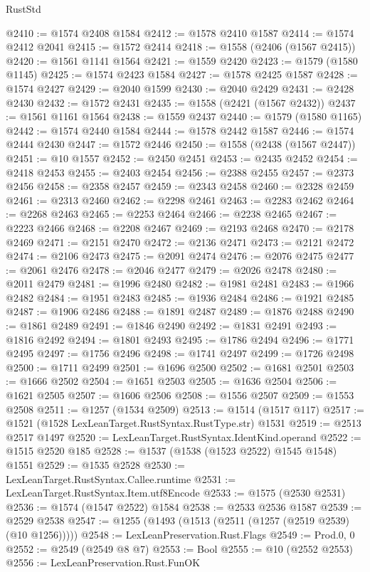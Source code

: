 \begin{lexlean}{RustStd}
\begin{coremodule}
@2410 := @1574 @2408 @1584
@2412 := @1578 @2410 @1587
@2414 := @1574 @2412 @2041
@2415 := @1572 @2414
@2418 := @1558 (@2406 (@1567 @2415))
@2420 := @1561 @1141 @1564
@2421 := @1559 @2420
@2423 := @1579 (@1580 @1145)
@2425 := @1574 @2423 @1584
@2427 := @1578 @2425 @1587
@2428 := @1574 @2427
@2429 := @2040 @1599
@2430 := @2040 @2429
@2431 := @2428 @2430
@2432 := @1572 @2431
@2435 := @1558 (@2421 (@1567 @2432))
@2437 := @1561 @1161 @1564
@2438 := @1559 @2437
@2440 := @1579 (@1580 @1165)
@2442 := @1574 @2440 @1584
@2444 := @1578 @2442 @1587
@2446 := @1574 @2444 @2430
@2447 := @1572 @2446
@2450 := @1558 (@2438 (@1567 @2447))
@2451 := @10 @1557
@2452 := @2450 @2451
@2453 := @2435 @2452
@2454 := @2418 @2453
@2455 := @2403 @2454
@2456 := @2388 @2455
@2457 := @2373 @2456
@2458 := @2358 @2457
@2459 := @2343 @2458
@2460 := @2328 @2459
@2461 := @2313 @2460
@2462 := @2298 @2461
@2463 := @2283 @2462
@2464 := @2268 @2463
@2465 := @2253 @2464
@2466 := @2238 @2465
@2467 := @2223 @2466
@2468 := @2208 @2467
@2469 := @2193 @2468
@2470 := @2178 @2469
@2471 := @2151 @2470
@2472 := @2136 @2471
@2473 := @2121 @2472
@2474 := @2106 @2473
@2475 := @2091 @2474
@2476 := @2076 @2475
@2477 := @2061 @2476
@2478 := @2046 @2477
@2479 := @2026 @2478
@2480 := @2011 @2479
@2481 := @1996 @2480
@2482 := @1981 @2481
@2483 := @1966 @2482
@2484 := @1951 @2483
@2485 := @1936 @2484
@2486 := @1921 @2485
@2487 := @1906 @2486
@2488 := @1891 @2487
@2489 := @1876 @2488
@2490 := @1861 @2489
@2491 := @1846 @2490
@2492 := @1831 @2491
@2493 := @1816 @2492
@2494 := @1801 @2493
@2495 := @1786 @2494
@2496 := @1771 @2495
@2497 := @1756 @2496
@2498 := @1741 @2497
@2499 := @1726 @2498
@2500 := @1711 @2499
@2501 := @1696 @2500
@2502 := @1681 @2501
@2503 := @1666 @2502
@2504 := @1651 @2503
@2505 := @1636 @2504
@2506 := @1621 @2505
@2507 := @1606 @2506
@2508 := @1556 @2507
@2509 := @1553 @2508
@2511 := @1257 (@1534 @2509)
@2513 := @1514 (@1517 @117)
@2517 := @1521 (@1528 LexLeanTarget.RustSyntax.RustType.str) @1531
@2519 := @2513 @2517 @1497
@2520 := LexLeanTarget.RustSyntax.IdentKind.operand
@2522 := @1515 @2520 @185
@2528 := @1537 (@1538 (@1523 @2522) @1545 @1548) @1551
@2529 := @1535 @2528
@2530 := LexLeanTarget.RustSyntax.Callee.runtime
@2531 := LexLeanTarget.RustSyntax.Item.utf8Encode
@2533 := @1575 (@2530 @2531)
@2536 := @1574 (@1547 @2522) @1584
@2538 := @2533 @2536 @1587
@2539 := @2529 @2538
@2547 := @1255 (@1493 (@1513 (@2511 (@1257 (@2519 @2539) (@10 @1256)))))
@2548 := LexLeanPreservation.Rust.Flags
@2549 := Prod.{0, 0}
@2552 := @2549 (@2549 @8 @7)
@2553 := Bool
@2555 := @10 (@2552 @2553)
@2556 := LexLeanPreservation.Rust.FunOK

\end{coremodule}
\end{lexlean}
